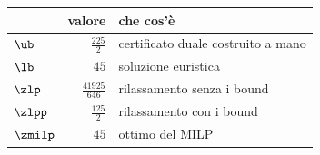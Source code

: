 \begin{center}\small
\begin{tabular}{lrl}
\toprule
 & valore & che cos'è \\
\midrule
$\ub$ & $\frac{225}{2}$ & certificato duale costruito a mano \\
$\lb$ & $45$ & soluzione euristica \\
$\zlp$ & $\frac{41925}{646}$ & rilassamento senza i bound \\
$\zlpp$ & $\frac{125}{2}$ & rilassamento con i bound \\
$\zmilp$ & $45$ & ottimo del MILP \\
\bottomrule
\end{tabular}
\end{center}
